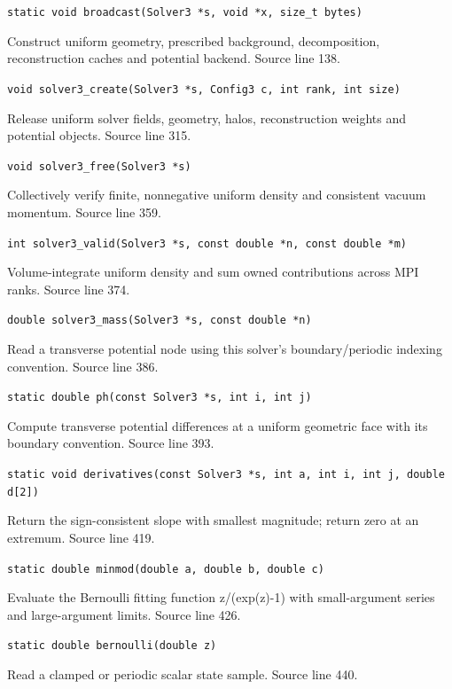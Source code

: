 \begin{description}[style=nextline,leftmargin=0pt,labelindent=0pt,labelwidth=0pt,labelsep=0pt]
{\small\nolinkurl{static void broadcast(Solver3 *s, void *x, size_t bytes)}}
\item[\texttt{solver3\_create}] Construct uniform geometry, prescribed background, decomposition, reconstruction caches and potential backend. Source line 138.\par
{\small\nolinkurl{void solver3_create(Solver3 *s, Config3 c, int rank, int size)}}
\item[\texttt{solver3\_free}] Release uniform solver fields, geometry, halos, reconstruction weights and potential objects. Source line 315.\par
{\small\nolinkurl{void solver3_free(Solver3 *s)}}
\item[\texttt{solver3\_valid}] Collectively verify finite, nonnegative uniform density and consistent vacuum momentum. Source line 359.\par
{\small\nolinkurl{int solver3_valid(Solver3 *s, const double *n, const double *m)}}
\item[\texttt{solver3\_mass}] Volume-integrate uniform density and sum owned contributions across MPI ranks. Source line 374.\par
{\small\nolinkurl{double solver3_mass(Solver3 *s, const double *n)}}
\item[\texttt{ph}] Read a transverse potential node using this solver's boundary/periodic indexing convention. Source line 386.\par
{\small\nolinkurl{static double ph(const Solver3 *s, int i, int j)}}
\item[\texttt{derivatives}] Compute transverse potential differences at a uniform geometric face with its boundary convention. Source line 393.\par
{\small\nolinkurl{static void derivatives(const Solver3 *s, int a, int i, int j, double d[2])}}
\item[\texttt{minmod}] Return the sign-consistent slope with smallest magnitude; return zero at an extremum. Source line 419.\par
{\small\nolinkurl{static double minmod(double a, double b, double c)}}
\item[\texttt{bernoulli}] Evaluate the Bernoulli fitting function z/(exp(z)-1) with small-argument series and large-argument limits. Source line 426.\par
{\small\nolinkurl{static double bernoulli(double z)}}
\item[\texttt{value}] Read a clamped or periodic scalar state sample. Source line 440.\par

\end{description}
